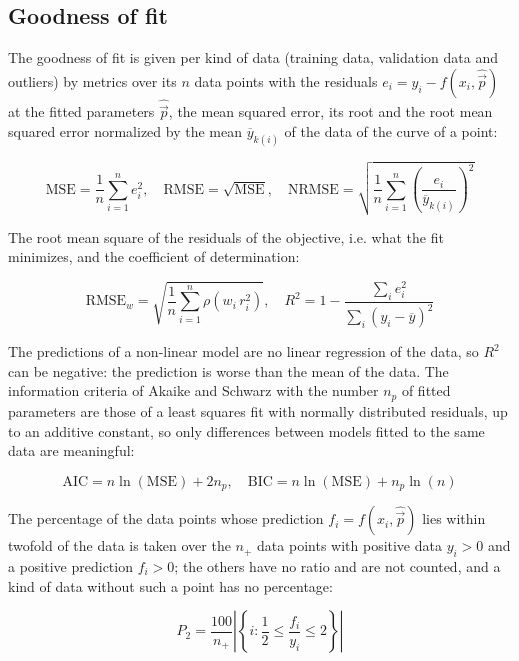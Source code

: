\subsection{Goodness of fit}

The goodness of fit is given per kind of data (training data, validation data and outliers) by metrics over its $n$ data points with the residuals $e_i = y_i - f(x_i, \hat{\vec{p}})$ at the fitted parameters $\hat{\vec{p}}$, the mean squared error, its root and the root mean squared error normalized by the mean $\overline{y}_{k(i)}$ of the data of the curve of a point:

\begin{equation}
\mathrm{MSE} = \frac{1}{n} \sum_{i=1}^{n} e_i^2, \quad \mathrm{RMSE} = \sqrt{\mathrm{MSE}}, \quad \mathrm{NRMSE} = \sqrt{\frac{1}{n} \sum_{i=1}^{n} \left(\frac{e_i}{\overline{y}_{k(i)}}\right)^2}
\end{equation}

The root mean square of the residuals of the objective, i.e. what the fit minimizes, and the coefficient of determination:

\begin{equation}
\mathrm{RMSE}_w = \sqrt{\frac{1}{n} \sum_{i=1}^{n} \rho\left(w_i\, r_i^2\right)}, \quad R^2 = 1 - \frac{\sum_{i} e_i^2}{\sum_{i} \left(y_i - \overline{y}\right)^2}
\end{equation}

The predictions of a non-linear model are no linear regression of the data, so $R^2$ can be negative: the prediction is worse than the mean of the data. The information criteria of Akaike \cite{Akaike1974} and Schwarz \cite{Schwarz1978} with the number $n_p$ of fitted parameters are those of a least squares fit with normally distributed residuals, up to an additive constant, so only differences between models fitted to the same data are meaningful:

\begin{equation}
\mathrm{AIC} = n \ln(\mathrm{MSE}) + 2 n_p, \quad \mathrm{BIC} = n \ln(\mathrm{MSE}) + n_p \ln(n)
\end{equation}

The percentage of the data points whose prediction $f_i = f(x_i, \hat{\vec{p}})$ lies within twofold of the data is taken over the $n_+$ data points with positive data $y_i > 0$ and a positive prediction $f_i > 0$; the others have no ratio and are not counted, and a kind of data without such a point has no percentage:

\begin{equation}
P_2 = \frac{100}{n_+} \left|\left\{ i : \frac{1}{2} \le \frac{f_i}{y_i} \le 2 \right\}\right|
\end{equation}

